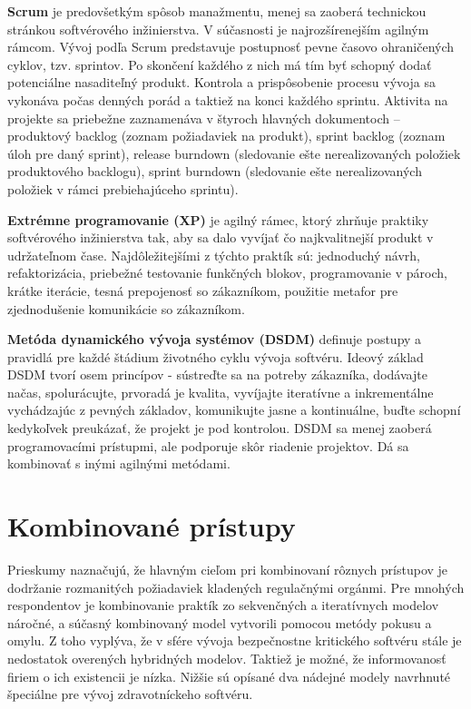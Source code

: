 \documentclass[10pt,twoside,slovak,a4paper]{article}
\begin{document}
\textbf{Scrum} je predovšetkým spôsob manažmentu, menej sa zaoberá technickou stránkou softvérového inžinierstva. V súčasnosti je najrozšírenejším agilným rámcom\cite{agileReport}. Vývoj podľa Scrum predstavuje postupnosť pevne časovo ohraničených cyklov, tzv. sprintov. Po skončení každého z nich má tím byť schopný dodať potenciálne nasaditeľný produkt. Kontrola a prispôsobenie procesu vývoja sa vykonáva počas denných porád a taktiež na konci každého sprintu. Aktivita na projekte sa priebežne zaznamenáva v štyroch hlavných dokumentoch – produktový backlog (zoznam požiadaviek na produkt), sprint backlog (zoznam úloh pre daný sprint), release burndown (sledovanie ešte nerealizovaných položiek produktového backlogu), sprint burndown (sledovanie ešte nerealizovaných položiek v rámci prebiehajúceho sprintu)\cite{scrum}.

\textbf{Extrémne programovanie (XP)} je agilný rámec, ktorý zhrňuje praktiky softvérového inžinierstva tak, aby sa dalo vyvíjať čo najkvalitnejší produkt v udržateľnom čase. Najdôležitejšími z týchto praktík sú: jednoduchý návrh, refaktorizácia, priebežné testovanie funkčných blokov, programovanie v pároch, krátke iterácie, tesná prepojenosť so zákazníkom, použitie metafor pre zjednodušenie komunikácie so zákazníkom\cite{XP}.

\textbf{Metóda dynamického vývoja systémov (DSDM)} definuje postupy a pravidlá pre každé štádium životného cyklu vývoja softvéru. Ideový základ DSDM tvorí osem princípov - sústreďte sa na potreby zákazníka, dodávajte načas, spolurácujte, prvoradá je kvalita, vyvíjajte iteratívne a inkrementálne vychádzajúc z pevných základov, komunikujte jasne a kontinuálne, buďte schopní kedykoľvek preukázať, že projekt je pod kontrolou. DSDM sa menej zaoberá programovacími prístupmi, ale podporuje skôr riadenie projektov. Dá sa kombinovať s inými agilnými metódami\cite{dsdm}.

\section{Kombinované prístupy}
Prieskumy naznačujú, že hlavným cieľom pri kombinovaní rôznych prístupov je dodržanie rozmanitých požiadaviek kladených regulačnými orgánmi. Pre mnohých respondentov je kombinovanie praktík zo sekvenčných a iteratívnych modelov náročné, a súčasný kombinovaný model vytvorili pomocou metódy pokusu a omylu\cite{hybridReport}. Z toho vyplýva, že v sfére vývoja bezpečnostne kritického softvéru stále je nedostatok overených hybridných modelov. Taktiež je možné, že informovanosť firiem o ich existencii je nízka. Nižšie sú opísané dva nádejné modely navrhnuté špeciálne pre vývoj zdravotníckeho softvéru.
\end{document}

